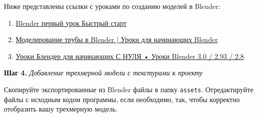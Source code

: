 \documentclass[a4paper,12pt]{article}
\begin{document}
    Ниже представлены ссылки с уроками по созданию моделей в Blender:
    \begin{enumerate}
        \item \href{https://www.youtube.com/watch?v=Y0ayZ1dx78Y}{Blender первый урок Быстрый старт}
        \item \href{https://www.youtube.com/watch?v=OoCGosEVbm0}{Моделирование трубы в Blender | Уроки для начинающих Blender}
        \item \href{https://www.youtube.com/watch?v=vcRe0l-X4ko}{Уроки Блендер для начинающих С НУЛЯ • Уроки Blender 3.0 / 2.93 / 2.8}
    \end{enumerate}
        
    \textbf{Шаг 4.} \textit{Добавление трехмерной модели с текстурами к проекту}
    
    Скопируйте экспортированные из Blender файлы в папку \texttt{assets}. Отредактируйте файлы с исходным кодом программы, если необходимо, так, чтобы корректно отобразить вашу трехмерную модель.
   
\end{document}
